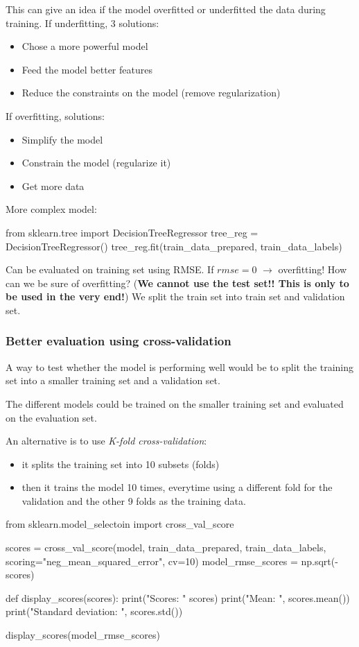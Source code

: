     This can give an idea if the model overfitted or underfitted the data during training.
    If underfitting, 3 solutions:
    \begin{itemize}
        \item Chose a more powerful model
        \item Feed the model better features
        \item Reduce the constraints on the model (remove regularization)
    \end{itemize}
    If overfitting, solutions:
    \begin{itemize}
        \item Simplify the model
        \item Constrain the model (regularize it)
        \item Get more data
    \end{itemize}

    More complex model:
    \begin{python}
        from sklearn.tree import DecisionTreeRegressor
        tree_reg = DecisionTreeRegressor()
        tree_reg.fit(train_data_prepared, train_data_labels)
    \end{python}
    Can be evaluated on training set using RMSE.
    If $rmse=0$ $\rightarrow$ overfitting!
    How can we be sure of overfitting? (\textbf{We cannot use the test set!! This is only to be used in the very end!})
    We split the train set into train set and validation set.

\subsubsection*{Better evaluation using cross-validation}
    A way to test whether the model is performing well would be to split the training set into a smaller training set and a validation set.

    The different models could be trained on the smaller training set and evaluated on the evaluation set.

    An alternative is to use \emph{K-fold cross-validation}:\\
    \begin{itemize}
        \item it splits the training set into 10 subsets (folds)
        \item then it trains the model 10 times, everytime using a different fold for the validation and the other 9 folds as the training data.
    \end{itemize}
    \begin{python}
        from sklearn.model_selectoin import cross_val_score

        scores = cross_val_score(model, train_data_prepared, train_data_labels,
                    scoring="neg_mean_squared_error", cv=10)
        model_rmse_scores = np.sqrt(-scores)

        def display_scores(scores):
            print("Scores: " scores)
            print("Mean: ", scores.mean())
            print("Standard deviation: ", scores.std())

        display_scores(model_rmse_scores)
    \end{python}

